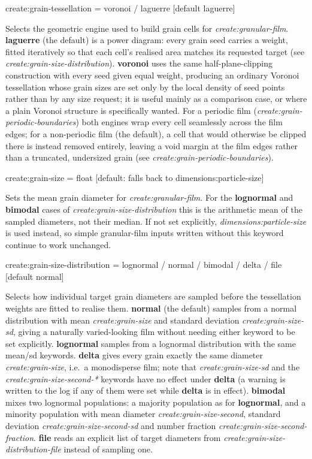 {\zicf create:grain-tessellation = voronoi / laguerre [default laguerre]} Selects the geometric engine used to build grain cells for \textit{create:granular-film}. \textbf{laguerre} (the default) is a power diagram: every grain seed carries a weight, fitted iteratively so that each cell's realised area matches its requested target (see \textit{create:grain-size-distribution}). \textbf{voronoi} uses the same half-plane-clipping construction with every seed given equal weight, producing an ordinary Voronoi tessellation whose grain sizes are set only by the local density of seed points rather than by any size request; it is useful mainly as a comparison case, or where a plain Voronoi structure is specifically wanted. For a periodic film (\textit{create:grain-periodic-boundaries}) both engines wrap every cell seamlessly across the film edges; for a non-periodic film (the default), a cell that would otherwise be clipped there is instead removed entirely, leaving a void margin at the film edges rather than a truncated, undersized grain (see \textit{create:grain-periodic-boundaries}).

{\zicf create:grain-size = float [default: falls back to dimensions:particle-size]} Sets the mean grain diameter for \textit{create:granular-film}. For the \textbf{lognormal} and \textbf{bimodal} cases of \textit{create:grain-size-distribution} this is the arithmetic mean of the sampled diameters, not their median. If not set explicitly, \textit{dimensions:particle-size} is used instead, so simple granular-film inputs written without this keyword continue to work unchanged.

{\zicf create:grain-size-distribution = lognormal / normal / bimodal / delta / file [default normal]} Selects how individual target grain diameters are sampled before the tessellation weights are fitted to realise them. \textbf{normal} (the default) samples from a normal distribution with mean \textit{create:grain-size} and standard deviation \textit{create:grain-size-sd}, giving a naturally varied-looking film without needing either keyword to be set explicitly. \textbf{lognormal} samples from a lognormal distribution with the same mean/sd keywords. \textbf{delta} gives every grain exactly the same diameter \textit{create:grain-size}, i.e.\ a monodisperse film; note that \textit{create:grain-size-sd} and the \textit{create:grain-size-second-*} keywords have no effect under \textbf{delta} (a warning is written to the log if any of them were set while \textbf{delta} is in effect). \textbf{bimodal} mixes two lognormal populations: a majority population as for \textbf{lognormal}, and a minority population with mean diameter \textit{create:grain-size-second}, standard deviation \textit{create:grain-size-second-sd} and number fraction \textit{create:grain-size-second-fraction}. \textbf{file} reads an explicit list of target diameters from \textit{create:grain-size-distribution-file} instead of sampling one.

